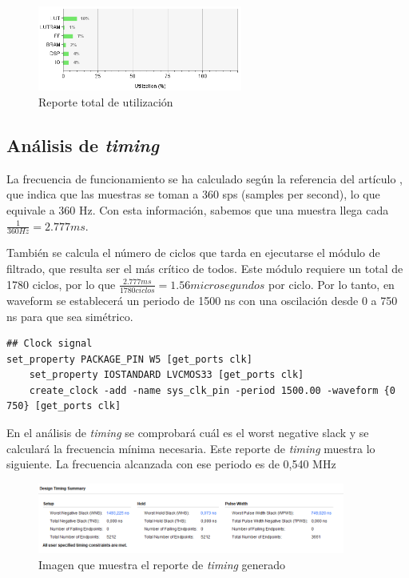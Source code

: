 \begin{figure}[h]
	\centering
	\includegraphics[width=0.6\textwidth]{./Images/img_res_experimentales/utilization3.png}
	\caption{Reporte total de utilización}
	\label{fig:utilization3}
\end{figure}


\subsection{Análisis de  \textit{timing} }

La frecuencia de funcionamiento se ha calculado según la referencia del artículo \cite{desai2021low}, que indica que las muestras se toman a 360 sps (samples per second), lo que equivale a 360 Hz. Con esta información, sabemos que una muestra llega cada \( \frac{1}{360 Hz} = 2.777 ms\).

También se calcula el número de ciclos que tarda en ejecutarse el módulo de filtrado, que resulta ser el más crítico de todos. Este módulo requiere un total de 1780 ciclos, por lo que \( \frac{2.777  ms}{1780 ciclos} = 1.56  microsegundos \) por ciclo. Por lo tanto, en waveform se establecerá un periodo de 1500 ns con una oscilación desde 0 a 750 ns para que sea simétrico.


\lstset{language=VHDL, breaklines=true, basicstyle=\footnotesize}
\begin{lstlisting}[frame=single]
## Clock signal
set_property PACKAGE_PIN W5 [get_ports clk]							
	set_property IOSTANDARD LVCMOS33 [get_ports clk]
	create_clock -add -name sys_clk_pin -period 1500.00 -waveform {0 750} [get_ports clk]
\end{lstlisting}

	En el análisis de  \textit{timing}  se comprobará cuál es el worst negative slack y se calculará la frecuencia mínima necesaria. Este reporte de  \textit{timing}  muestra lo siguiente. La frecuencia alcanzada con ese periodo es de 0,540 MHz

	\begin{figure}[h!]
		\centering
		\includegraphics[width=0.9\textwidth]{./Images/img_res_experimentales/reportetiming.png}
		\caption{Imagen que muestra el reporte de  \textit{timing}  generado}
		\label{fig:reporteTiming}
	\end{figure} 

